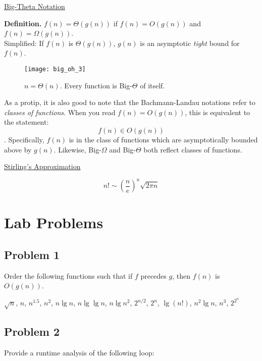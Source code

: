 \begin{framed}
    \begin{center}
        \underline{Big-Theta Notation}
    \end{center}
    \textbf{Definition.} $f(n) = \Theta(g(n))$ if $f(n) = O(g(n))$ and $f(n) = \Omega(g(n))$.\\

    Simplified: If $f(n)$ is $\Theta(g(n))$, $g(n)$ is an asymptotic \textit{tight} bound for $f(n)$.
\end{framed}

\begin{figure}[h]
    \centering
    \texttt{[image: big\_oh\_3]}
    \caption*{$n = \Theta(n)$. Every function is Big-$\Theta$ of itself.}
\end{figure}

As a protip, it is also good to note that the Bachmann-Landau notations refer to \textit{classes of functions}. When you read $f(n) = O(g(n))$, this is equivalent to the statement: $$f(n) \in O(g(n))$$. Specifically, $f(n)$ is in the class of functions which are asymptotically bounded above by $g(n)$. Likewise, Big-$\Omega$ and Big-$\Theta$ both reflect classes of functions.

\begin{framed}
    \begin{center}
        \underline{Stirling's Approximation}
    \end{center}
    $$n! \sim (\frac{n}{e})^n \sqrt{2\pi n}$$
\end{framed}

\section*{Lab Problems}

\subsection*{Problem 1}
Order the following functions such that if $f$ precedes $g$, then $f(n)$ is $O(g(n))$.

\begin{center}
    $\sqrt{n}$, $n$, $n^{1.5}$, $n^2$, $n \lg{n}$, $n\lg\lg{n}$, $n\lg{n^2}$, $2^{n/2}$, $2^n$, $\lg(n!)$, $n^2\lg{n}$, $n^3$, $2^{2^n}$
\end{center}

\subsection*{Problem 2}
Provide a runtime analysis of the following loop:


